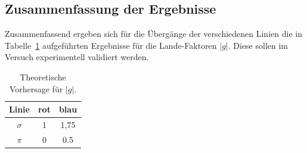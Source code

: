 \subsection{Zusammenfassung der Ergebnisse}
Zusammenfassend ergeben sich für die Übergänge der verschiedenen Linien die
in Tabelle~\ref{tab:lande} aufgeführten Ergebnisse für die Lande-Faktoren $|g|$.
Diese sollen im Versuch experimentell validiert werden.
%
\begin{table}[H]
    \centering
    \caption{Theoretische Vorhersage für $|g|$.}
    \begin{tabular}{ccc}
    \toprule
    {Linie} & {rot}  & {blau} \\
		\midrule
    $\sigma$ & 1 & 1,75  \\
	  $\pi$ & 0 & 0.5 \\
    \bottomrule
	\end{tabular}
    \label{tab:lande}
\end{table}
